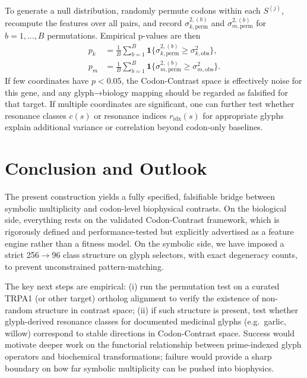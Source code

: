 \documentclass[11pt]{article}
\begin{document}
To generate a null distribution, randomly permute codons within each $S^{(j)}$, recompute the features over all pairs, and record $\sigma^{2,(b)}_{k,\text{perm}}$ and $\sigma^{2,(b)}_{m,\text{perm}}$ for $b=1,\dots,B$ permutations. Empirical p-values are then
\begin{align}
  p_k &= \frac{1}{B}\sum_{b=1}^B \mathbf{1}\{\sigma^{2,(b)}_{k,\text{perm}}\ge \sigma^2_{k,\text{obs}}\},\\
  p_m &= \frac{1}{B}\sum_{b=1}^B \mathbf{1}\{\sigma^{2,(b)}_{m,\text{perm}}\ge \sigma^2_{m,\text{obs}}\}.
\end{align}
If few coordinates have $p<0.05$, the Codon-Contrast space is effectively noise for this gene, and any glyph→biology mapping should be regarded as falsified for that target. If multiple coordinates are significant, one can further test whether resonance classes $c(s)$ or resonance indices $r_{\text{idx}}(s)$ for appropriate glyphs explain additional variance or correlation beyond codon-only baselines.

\section{Conclusion and Outlook}

The present construction yields a fully specified, falsifiable bridge between symbolic multiplicity and codon-level biophysical contrasts. On the biological side, everything rests on the validated Codon-Contrast framework, which is rigorously defined and performance-tested but explicitly advertised as a feature engine rather than a fitness model.\cite{codoncontrast} On the symbolic side, we have imposed a strict 256$\to$96 class structure on glyph selectors, with exact degeneracy counts, to prevent unconstrained pattern-matching.\cite{glyphengine}

The key next steps are empirical: (i) run the permutation test on a curated TRPA1 (or other target) ortholog alignment to verify the existence of non-random structure in contrast space; (ii) if such structure is present, test whether glyph-derived resonance classes for documented medicinal glyphs (e.g.\ garlic, willow) correspond to stable directions in Codon-Contrast space. Success would motivate deeper work on the functorial relationship between prime-indexed glyph operators and biochemical transformations; failure would provide a sharp boundary on how far symbolic multiplicity can be pushed into biophysics.

\nocite{*}


\end{document}
